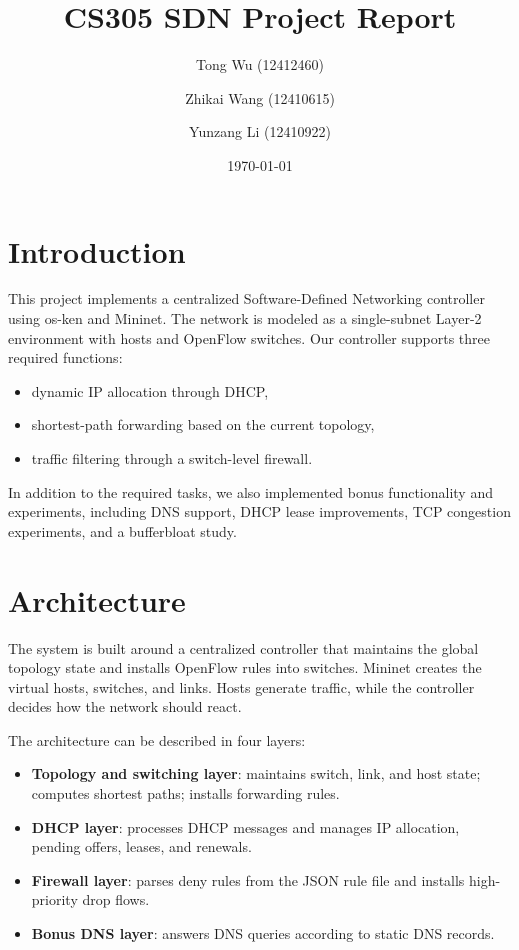 \documentclass[11pt,a4paper]{article}
\title{CS305 SDN Project Report}
\author{
    Tong Wu (12412460) \and
    Zhikai Wang (12410615) \and
    Yunzang Li (12410922)
}
\date{\today}
\begin{document}
\maketitle

\section{Introduction}

This project implements a centralized Software-Defined Networking controller using
os-ken and Mininet. The network is modeled as a single-subnet Layer-2 environment with
hosts and OpenFlow switches. Our controller supports three required functions:

\begin{itemize}[leftmargin=1.5em]
    \item dynamic IP allocation through DHCP,
    \item shortest-path forwarding based on the current topology,
    \item traffic filtering through a switch-level firewall.
\end{itemize}

In addition to the required tasks, we also implemented bonus functionality and
experiments, including DNS support, DHCP lease improvements, TCP congestion experiments,
and a bufferbloat study.

\section{Architecture}

The system is built around a centralized controller that maintains the global topology
state and installs OpenFlow rules into switches. Mininet creates the virtual hosts,
switches, and links. Hosts generate traffic, while the controller decides how the network
should react.

The architecture can be described in four layers:

\begin{itemize}[leftmargin=1.5em]
    \item \textbf{Topology and switching layer}: maintains switch, link, and host state;
    computes shortest paths; installs forwarding rules.
    \item \textbf{DHCP layer}: processes DHCP messages and manages IP allocation, pending
    offers, leases, and renewals.
    \item \textbf{Firewall layer}: parses deny rules from the JSON rule file and installs
    high-priority drop flows.
    \item \textbf{Bonus DNS layer}: answers DNS queries according to static DNS records.
\end{itemize}
\end{document}
